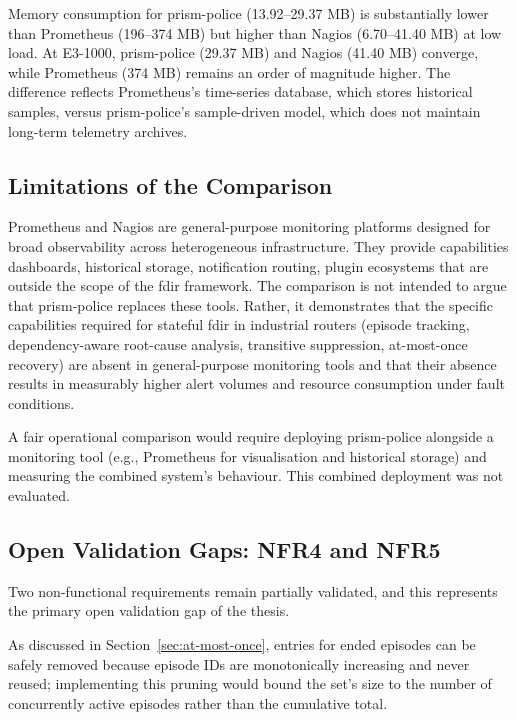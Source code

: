 Memory consumption for prism-police (13.92--29.37 MB) is substantially lower than Prometheus (196--374 MB) but higher than Nagios (6.70--41.40 MB) at low load. At E3-1000, prism-police (29.37 MB) and Nagios (41.40 MB) converge, while Prometheus (374 MB) remains an order of magnitude higher. The difference reflects Prometheus's time-series database, which stores historical samples, versus prism-police's sample-driven model, which does not maintain long-term telemetry archives.

\subsection{Limitations of the Comparison}

Prometheus and Nagios are general-purpose monitoring platforms designed for broad observability across heterogeneous infrastructure. They provide capabilities dashboards, historical storage, notification routing, plugin ecosystems that are outside the scope of the \gls{fdir} framework. The comparison is not intended to argue that prism-police replaces these tools. Rather, it demonstrates that the specific capabilities required for stateful \gls{fdir} in industrial routers (episode tracking, dependency-aware root-cause analysis, transitive suppression, at-most-once recovery) are absent in general-purpose monitoring tools and that their absence results in measurably higher alert volumes and resource consumption under fault conditions.

A fair operational comparison would require deploying prism-police alongside a monitoring tool (e.g., Prometheus for visualisation and historical storage) and measuring the combined system's behaviour. This combined deployment was not evaluated.

\subsection{Open Validation Gaps: NFR4 and NFR5}

Two non-functional requirements remain partially validated, and this represents the primary open validation gap of the thesis.

As discussed in Section~\ref{sec:at-most-once}, entries for ended episodes can be safely removed because episode IDs are monotonically increasing and never reused; implementing this pruning would bound the set's size to the number of concurrently active episodes rather than the cumulative total.

